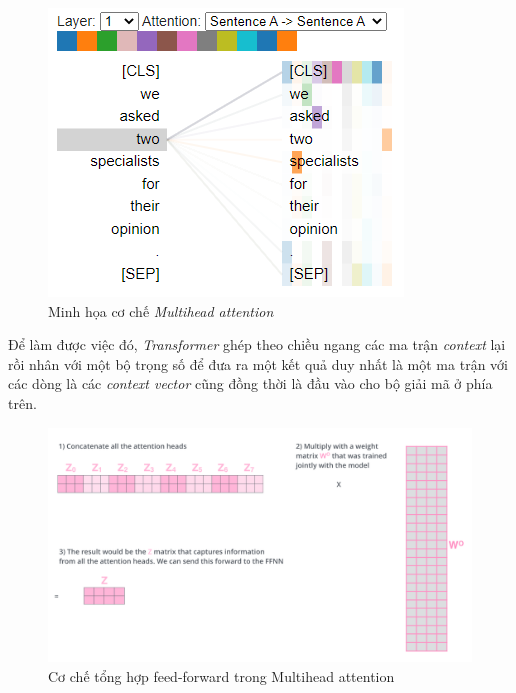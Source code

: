 \begin{figure}[H]
    \begin{center}
        \includegraphics[scale=0.8]{images/multihead-context-vector}
        \caption{Minh họa cơ chế \textit{Multihead attention}}
        \label{fig:multihead-context-vector}
    \end{center}
\end{figure}

Để làm được việc đó, \textit{Transformer} ghép theo chiều ngang các ma trận \textit{context} lại rồi nhân với một bộ trọng số để đưa ra một kết quả duy nhất là một ma trận với các dòng là các \textit{context vector} cũng đồng thời là đầu vào cho bộ giải mã ở phía trên.

\begin{figure}[H]
    \begin{center}
        \includegraphics[scale=0.3]{images/transformer_attention_heads_weight_matrix_o}
        \caption{Cơ chế tổng hợp feed-forward trong Multihead attention\cite{illustrated.transformer}}
        \label{fig:multihead-feed-forward}
    \end{center}
\end{figure}

